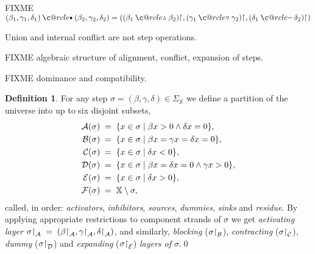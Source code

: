 \documentclass [a4paper,12pt] {article}
\makeatletter
\theoremstyle{definition}
\newtheorem{definition}{Definition}[section]
\newcommand{\carrier}{}
\DeclareRobustCommand{\carrier}{\mathop{\textstyle\mathsmaller{\bf {Car}}}}
\newcommand\c@rcle[2]{\mathbin{\ooalign{\hidewidth$#1#2$\hidewidth\crcr$#1\ocircle$}}}
\newcommand{\oeq}{\mathbin{\mathpalette\c@rcle{\raisebox{0.08em}{$\mathsmaller{=}$}}}}
\newcommand{\obullet}{\mathbin{\mathpalette\c@rcle{\raisebox{0.08em}{$\mathsmaller{\bullet}$}}}}
\newcommand{\wxp}{\mathbin{\mathpalette\c@rcle{\raisebox{0.035em}{$\mathsmaller{\triangledown}$}}}}
\newcommand{\wct}{\mathbin{\mathpalette\c@rcle{\raisebox{0.085em}{$\mathsmaller{\vartriangle}$}}}}
\makeatother
\begin{document}
FIXME $(\beta_1, \gamma_1, \delta_1) \obullet (\beta_2, \gamma_2,
\delta_2) = ((\beta_1 \wct \beta_2){\restriction}_{\carrier},
(\gamma_1 \wxp \gamma_2){\restriction}_{\carrier}, (\delta_1 \oeq
\delta_2){\restriction}_{\carrier})$

Union and internal conflict are not step operations.

FIXME algebraic structure of alignment, conflict, expansion of steps.

FIXME dominance and compatibility.

\begin {definition}\label{def-layers}
  For any step $\sigma = (\beta, \gamma, \delta) \in \Sigma_{\mathbb
    X}$ we define a partition of the universe into up to six disjoint
  subsets,
\begin {align*}
  {\cal A}(\sigma) &\;=\; \{x \in \carrier{\sigma} \;|\; \beta x > 0
  \wedge \delta x = 0\},\\
  {\cal B}(\sigma) &\;=\; \{x \in \carrier{\sigma} \;|\; \beta x =
  \gamma x = \delta x = 0\},\\
  {\cal C}(\sigma) &\;=\; \{x \in \carrier{\sigma} \;|\; \delta x <
  0\},\\
  {\cal D}(\sigma) &\;=\; \{x \in \carrier{\sigma} \;|\; \beta x =
  \delta x = 0 \wedge \gamma x > 0\},\\
  {\cal E}(\sigma) &\;=\; \{x \in \carrier{\sigma} \;|\; \delta x >
  0\},\\
  {\cal F}(\sigma) &\;=\; {\mathbb X} \setminus \carrier{\sigma},
\end {align*}
%
called, in order: {\em activators}\/, {\em inhibitors}\/, {\em
  sources}\/, {\em dummies}\/, {\em sinks}\/ and {\em residue}\/.  By
applying appropriate restrictions to component strands of $\sigma$
we get {\em activating layer}\/ $\sigma{\restriction}_{\cal A}\;=\;
(\beta{\restriction}_{\cal A}, \gamma{\restriction}_{\cal A},
\delta{\restriction}_{\cal A})$, and similarly, {\em blocking}\/
($\sigma{\restriction}_{\cal B}$), {\em contracting}\/
($\sigma{\restriction}_{\cal C}$), {\em dummy}\/
($\sigma{\restriction}_{\cal D}$) and {\em expanding}\/
($\sigma{\restriction}_{\cal E}$) {\em layers of}\/ $\sigma$.\qed
\end {definition}
\end{document}
